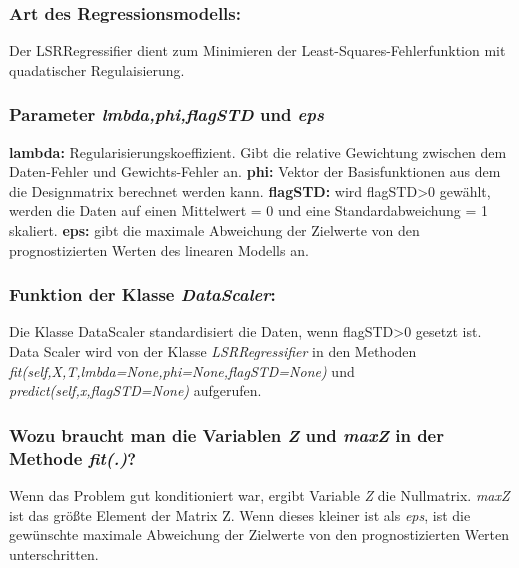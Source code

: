 \subsubsection{ Art des Regressionsmodells: }

\noindent
 \vspace{0px}
Der LSRRegressifier dient zum Minimieren der Least-Squares-Fehlerfunktion mit quadatischer Regulaisierung.

\subsubsection{ Parameter \textit{lmbda,phi,flagSTD} und \textit{eps} }

\noindent
 \vspace{0px}
\textbf{lambda:} Regularisierungskoeffizient. Gibt die relative Gewichtung zwischen dem Daten-Fehler und Gewichts-Fehler an. 
\noindent
 \vspace{0px}
\textbf{phi:} Vektor der Basisfunktionen aus dem die Designmatrix berechnet werden kann. 
\noindent
 \vspace{0px}
\textbf{flagSTD:} wird flagSTD>0 gewählt, werden die Daten auf einen Mittelwert = 0 und eine Standardabweichung = 1 skaliert.  
\noindent
 \vspace{0px}
\textbf{eps:} gibt die maximale Abweichung der Zielwerte von den prognostizierten Werten des linearen Modells an. 

\subsubsection{ Funktion der Klasse \textit{DataScaler}: }

\noindent
 \vspace{0px}
Die Klasse DataScaler standardisiert die Daten, wenn flagSTD>0 gesetzt ist. 
Data Scaler wird von der Klasse \textit{LSRRegressifier} in den Methoden \textit{fit(self,X,T,lmbda=None,phi=None,flagSTD=None)} und \textit{predict(self,x,flagSTD=None)} aufgerufen.


\subsubsection{ Wozu braucht man die Variablen \textit{Z} und \textit{maxZ} in der Methode \textit{fit(.)}? }

\noindent
 \vspace{0px}
Wenn das Problem gut konditioniert war, ergibt Variable \textit{Z} die Nullmatrix. \textit{maxZ} ist das größte Element der Matrix Z.
Wenn dieses kleiner ist als \textit{eps}, ist die gewünschte maximale Abweichung der Zielwerte von den prognostizierten Werten unterschritten. 

